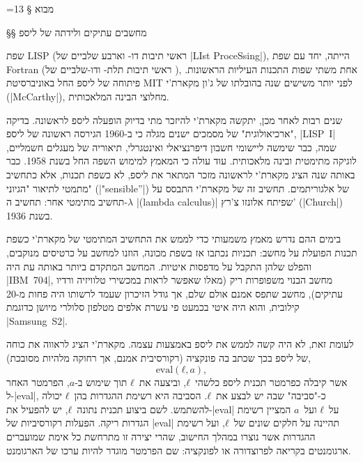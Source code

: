 \def\CPL{\E|C|\xspace}

\newcommand{\TopAlign}[1]{\adjustbox{valign=t}{#1}}
{%
    \makeatletter
    =13\relax%
    \gdef\fixNewLine{%
        \def^^M{\space}%
    }%
}
§ מבוא

§§ מחשבים עתיקים ולידתה של ליספ

שפת LISP (ראשי תיבות דו- וארבע שלביים של \E|LIst ProceSsing|), הייתה, יחד עם
שפת Fortran (ראשי תיבות תלת- ודו-שלביים של ), אחת משתי
שפות התכנות העיליות הראשונות. פיתוחה של ליספ החל באוניברסיטת MIT לפני יותר
משישים שנה בהובלתו של ג'ון מקארת'י (\E|McCarthy|), מחלוצי הבינה המלאכותית.

שנים רבות לאחר מכן, יתקשה מקארת'י להיזכר מתי בדיוק הופעלה ליספ לראשונה.
בדיקה "ארכיאולוגית" של מסמכים ישנים מגלה כי ב-1960 הגירסה ראשונה של ליספ,
\E|LISP~I| שמה, כבר שימשה ליישומי חשבון דיפרנציאלי ואינטגרלי, תיאוריה של מעגלים
חשמליים, לוגיקה מתימטית ובינה מלאכותית. עוד עולה כי המאמץ למימוש השפה החל בשנת
1958. כבר באותה שנה הציג מקארת'י לראשונה מזכר המתאר את ליספ, לא כשפת תכנות, אלא
כתחשיב מתמטי לתיאור "הגיוני" (\E|"sensible”|) של אלגוריתמים. תחשיב זה של
מקארת'י התבסס על תחשיב מתימטי אחר: תחשיב ה-$λ$ \E|(lambda calculus)| שפיתח
אלונזו צ'רץ' (\E|Church|) בשנת 1936.

בימים ההם נדרש מאמץ משמעותי כדי לממש את התחשיב המתימטי של מקארת'י כשפת תכנות
הפועלת על מחשב: תכניות נכתבו אז בשפת מכונה, הוזנו למחשב על כרטיסים מנוקבים,
והפלט שלהן התקבל על מדפסות איטיות. המחשב המתקדם ביותר באותה עת היה \E|IBM~704|,
מחשב הבנוי משפופרות ריק (מאלו שאפשר לראות במכשירי טלוויזיה ורדיו עתיקים), מחשב
שתפס אמנם אולם שלם, אך גודל הזיכרון שעמד לרשותו היה פחות מ-20 קילובית, והוא היה
איטי בכמעט פי עשרת אלפים מטלפון סלולרי מיושן כדוגמת \E|Samsung~S2|.

לעומת זאת, לא היה קשה לממש את ליספ באמצעות עצמה. מקארת'י הציג לראווה את כוחה
של ליספ בכך שכתב בה פונקציה (רקורסיבית אמנם, אך רחוקה מלהיות מסובכת),
\begin{equation} \label{eq:eval}
  \text{eval}(ℓ, a),
\end{equation}
אשר קיבלה כפרמטר תכנית ליספ כלשהי~$ℓ$, וביצעה את~$ℓ$ תוך שימוש ב-$a$, הפרמטר
האחר ל-\E|eval|, כ-"סביבה" שבה יש לבצע את~$ℓ$. הסביבה היא רשימת ההגדרות בהן~$ℓ$
יכולה להשתמש. לשם ביצוע תכנית נתונה~$ℓ$, יש להפעיל את-\E|eval| על~$ℓ$
ועל~$a$ המציין רשימת הגדרות ריקה. הפעלות רקורסיביות של \E|eval| תהיינה על חלקים
שונים של~$ℓ$, ועל רשימת ההגדרות אשר נוצרו במהלך החישוב, שהרי יצירה זו מתרחשת כל
אימת שמועברים ארגומנטים בקריאה לפרוצדורה או לפונקציה: שם הפרמטר מוגדר להיות
ערכו של הארגומנט.

